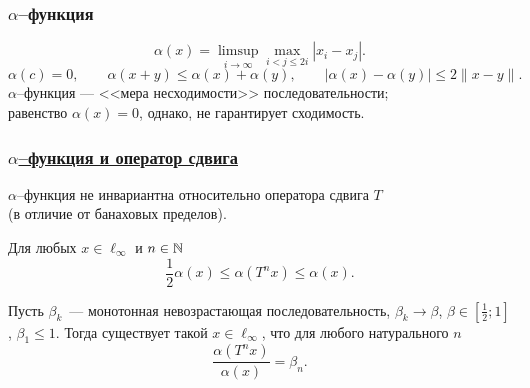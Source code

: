\begin{frame}\frametitle{$\alpha$--функция}
	\begin{equation}
		\alpha(x) = \limsup_{i\to\infty} \max_{i<j\leqslant 2i} |x_i - x_j|
		.
	\end{equation}
	\vfill
	\begin{equation}
		\alpha(c)=0,
		\qquad
		\alpha(x+y) \leq \alpha(x) + \alpha(y),
		\qquad
		|\alpha(x) - \alpha(y)| \leq 2 \|x-y\|
		.
	\end{equation}
	\vfill
	$\alpha$--функция --- <<мера несходимости>> последовательности;
	\\
	равенство $\alpha(x) = 0$, однако, не гарантирует сходимость.

\end{frame}

\begin{frame}\frametitle{\underline{$\alpha$--функция и оператор сдвига}}

	$\alpha$--функция не инвариантна относительно оператора сдвига $T$
	\\
	(в отличие от банаховых пределов).

	\begin{ttheorem}
		Для любых $x\in\ell_\infty$ и $n \in \mathbb{N}$
		\begin{equation}\label{est_alpha_Tn_x}
			\frac{1}{2}\alpha(x) \leq \alpha(T^n x) \leq \alpha(x)
			.
		\end{equation}
	\end{ttheorem}

	\begin{ttheorem}
		Пусть $\beta_k$~--- монотонная невозрастающая последовательность,
		$\beta_k \to \beta$, $\beta\in\left[\frac{1}{2}; 1\right]$, $\beta_1 \leq 1$.
		Тогда существует такой $x\in\ell_\infty$, что для любого натурального $n$
		\begin{equation}
			\frac{\alpha(T^n x)}{\alpha(x)} = \beta_n.
		\end{equation}
	\end{ttheorem}
\end{frame}


